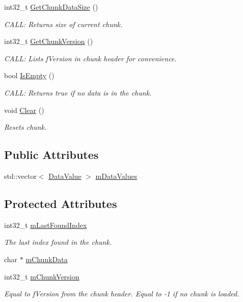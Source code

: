 \begin{DoxyCompactItemize}
int32\+\_\+t \hyperlink{a00014_ac113458fcdec81f316014ea4c3d73582}{Get\+Chunk\+Data\+Size} ()
\begin{DoxyCompactList}\small\item\em C\+A\+L\+L\+: Returns size of current chunk. \end{DoxyCompactList}\item 
int32\+\_\+t \hyperlink{a00014_a8203d58398537e3d254b43f9d321af4c}{Get\+Chunk\+Version} ()
\begin{DoxyCompactList}\small\item\em C\+A\+L\+L\+: Lists f\+Version in chunk header for convenience. \end{DoxyCompactList}\item 
bool \hyperlink{a00014_a88ab0773d25dad48ab6c693662243f47}{Is\+Empty} ()
\begin{DoxyCompactList}\small\item\em C\+A\+L\+L\+: Returns true if no data is in the chunk. \end{DoxyCompactList}\item 
void \hyperlink{a00014_a5718452d41c2292ba338b23ffc6cf29b}{Clear} ()
\begin{DoxyCompactList}\small\item\em Resets chunk. \end{DoxyCompactList}\end{DoxyCompactItemize}
\subsection*{Public Attributes}
\begin{DoxyCompactItemize}
\item 
std\+::vector$<$ \hyperlink{a00144}{Data\+Value} $>$ \hyperlink{a00014_af3963982859b42ddebdcaeba36dd1d29}{m\+Data\+Values}
\end{DoxyCompactItemize}
\subsection*{Protected Attributes}
\begin{DoxyCompactItemize}
\item 
int32\+\_\+t \hyperlink{a00014_a3e08508e7f92c6e43dd2de6a38868e2f}{m\+Last\+Found\+Index}
\begin{DoxyCompactList}\small\item\em The last index found in the chunk. \end{DoxyCompactList}\item 
char $\ast$ \hyperlink{a00014_a67054cdc2d8e55ff2c26947930784bc9}{m\+Chunk\+Data}
\item 
int32\+\_\+t \hyperlink{a00014_a5994e0adfb0189cbf5f9a3aa915b3f7d}{m\+Chunk\+Version}
\begin{DoxyCompactList}\small\item\em Equal to f\+Version from the chunk header. Equal to -\/1 if no chunk is loaded. \end{DoxyCompactList}\end{DoxyCompactItemize}
